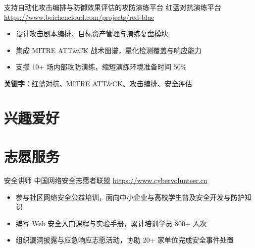 \documentclass[a4paper, serif, 10pt]{moderncv}
\begin{document}
        {支持自动化攻击编排与防御效果评估的攻防演练平台}
        {红蓝对抗演练平台}
        {\url{https://www.beichencloud.com/projects/red-blue}}
        {}
        {\begin{itemize}
\item 设计攻击剧本编排、目标资产管理与演练复盘模块
\item 集成 MITRE ATT\&CK 战术图谱，量化检测覆盖与响应能力
\item 支撑 10+ 场内部攻防演练，缩短演练环境准备时间 50\%
\end{itemize}
\textbf{关键字}：红蓝对抗、MITRE ATT\&CK、攻击编排、安全评估}
\section{兴趣爱好}

\section{志愿服务}

        {安全讲师}
        {中国网络安全志愿者联盟}
        {\url{https://www.cybervolunteer.cn}}
        {}
        {\begin{itemize}
\item 参与社区网络安全公益培训，面向中小企业与高校学生普及安全开发与防护知识
\item 编写 Web 安全入门课程与实验手册，累计培训学员 800+ 人次
\item 组织漏洞披露与应急响应志愿活动，协助 20+ 家单位完成安全事件处置
\end{itemize}}
    
\end{document}
